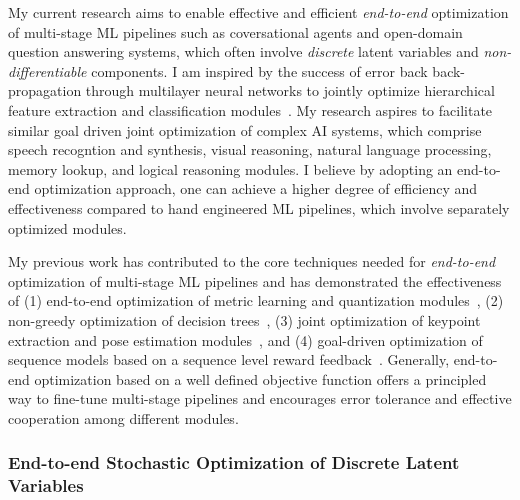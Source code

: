 \documentclass[a4paper, 10pt]{article}
\newcommand{\comment}[1]{}
\begin{document}
My current research aims to enable effective and efficient {\em
  end-to-end} optimization of multi-stage ML pipelines such as
coversational agents and open-domain question answering systems, which
often involve {\em discrete} latent variables and {\em
  non-differentiable} components. I am inspired by the success of
error back back-propagation through multilayer neural networks to
jointly optimize hierarchical feature extraction and classification
modules~\cite{backprop,lecun98}.  My research aspires to facilitate
similar goal driven joint optimization of complex AI systems, which
comprise speech recogntion and synthesis, visual reasoning, natural
language processing, memory lookup, and logical reasoning modules. I
believe by adopting an end-to-end optimization approach, one can
achieve a higher degree of efficiency and effectiveness compared to
hand engineered ML pipelines, which involve separately optimized
modules.

My previous work has contributed to the core techniques needed for
{\em end-to-end} optimization of multi-stage ML pipelines and has
demonstrated the effectiveness of (1) end-to-end optimization of
metric learning and quantization modules~\cite{mlh,hdml}, (2)
non-greedy optimization of decision trees~\cite{engodt}, (3) joint
optimization of keypoint extraction and pose estimation
modules~\cite{keypointnet}, and (4) goal-driven optimization of
sequence models based on a sequence level reward
feedback~\cite{mapo,ocd}. Generally, end-to-end optimization based on
a well defined objective function offers a principled way to fine-tune
multi-stage pipelines and encourages error tolerance and effective
cooperation among different modules.
\comment{

 My research program aims to
facilitate end-to-end optimization of coversational agents and
open-domain question answering systems, which involve speech
recognition, information retrieval, interaction with humans and
database management systems, and speech synthesis.


For example, consider speech to speech translation which
can be done by stacking speech recognition, machine translation, and
speech synthesis, all of which have been developed in the ML and NLP
community. That said 
}

\vspace*{-.2cm}
\subsubsection*{End-to-end Stochastic Optimization of Discrete Latent Variables}
\vspace*{-.1cm}
\end{document}

